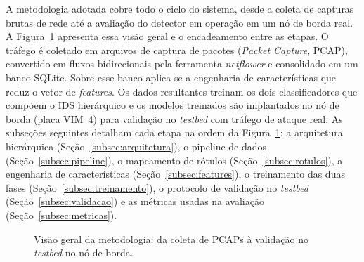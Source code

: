 \documentclass[12pt,a4paper]{article}
\begin{document}
A metodologia adotada cobre todo o ciclo do sistema, desde a coleta de capturas
brutas de rede até a avaliação do detector em operação em um nó de borda real.
A Figura~\ref{fig:metodologia} apresenta essa visão geral e o encadeamento entre
as etapas. O tráfego é coletado em arquivos de captura de pacotes (\textit{Packet
Capture}, PCAP), convertido em fluxos bidirecionais pela ferramenta
\textit{netflower} e consolidado em um banco SQLite. Sobre esse banco aplica-se a
engenharia de características que reduz o vetor de \textit{features}. Os dados
resultantes treinam os dois classificadores que compõem o IDS hierárquico e os
modelos treinados são implantados no nó de borda (placa VIM~4) para validação no
\textit{testbed} com tráfego de ataque real. As subseções seguintes detalham cada
etapa na ordem da Figura~\ref{fig:metodologia}: a arquitetura hierárquica
(Seção~\ref{subsec:arquitetura}), o pipeline de dados
(Seção~\ref{subsec:pipeline}), o mapeamento de rótulos
(Seção~\ref{subsec:rotulos}), a engenharia de características
(Seção~\ref{subsec:features}), o treinamento das duas fases
(Seção~\ref{subsec:treinamento}), o protocolo de validação no \textit{testbed}
(Seção~\ref{subsec:validacao}) e as métricas usadas na avaliação
(Seção~\ref{subsec:metricas}).

\begin{figure}[ht]
\centering
{}
\caption{Visão geral da metodologia: da coleta de PCAPs à validação no \textit{testbed} no nó de borda.}
\label{fig:metodologia}
\end{figure}
\end{document}
